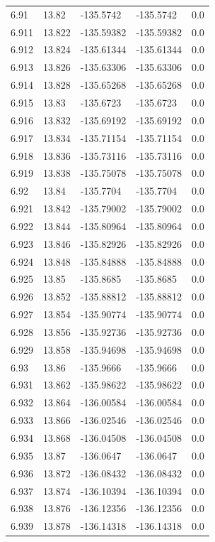 \begin{tabular}{lllll}
6.91 & 13.82 & -135.5742 & -135.5742 & 0.0 \\
6.911 & 13.822 & -135.59382 & -135.59382 & 0.0 \\
6.912 & 13.824 & -135.61344 & -135.61344 & 0.0 \\
6.913 & 13.826 & -135.63306 & -135.63306 & 0.0 \\
6.914 & 13.828 & -135.65268 & -135.65268 & 0.0 \\
6.915 & 13.83 & -135.6723 & -135.6723 & 0.0 \\
6.916 & 13.832 & -135.69192 & -135.69192 & 0.0 \\
6.917 & 13.834 & -135.71154 & -135.71154 & 0.0 \\
6.918 & 13.836 & -135.73116 & -135.73116 & 0.0 \\
6.919 & 13.838 & -135.75078 & -135.75078 & 0.0 \\
6.92 & 13.84 & -135.7704 & -135.7704 & 0.0 \\
6.921 & 13.842 & -135.79002 & -135.79002 & 0.0 \\
6.922 & 13.844 & -135.80964 & -135.80964 & 0.0 \\
6.923 & 13.846 & -135.82926 & -135.82926 & 0.0 \\
6.924 & 13.848 & -135.84888 & -135.84888 & 0.0 \\
6.925 & 13.85 & -135.8685 & -135.8685 & 0.0 \\
6.926 & 13.852 & -135.88812 & -135.88812 & 0.0 \\
6.927 & 13.854 & -135.90774 & -135.90774 & 0.0 \\
6.928 & 13.856 & -135.92736 & -135.92736 & 0.0 \\
6.929 & 13.858 & -135.94698 & -135.94698 & 0.0 \\
6.93 & 13.86 & -135.9666 & -135.9666 & 0.0 \\
6.931 & 13.862 & -135.98622 & -135.98622 & 0.0 \\
6.932 & 13.864 & -136.00584 & -136.00584 & 0.0 \\
6.933 & 13.866 & -136.02546 & -136.02546 & 0.0 \\
6.934 & 13.868 & -136.04508 & -136.04508 & 0.0 \\
6.935 & 13.87 & -136.0647 & -136.0647 & 0.0 \\
6.936 & 13.872 & -136.08432 & -136.08432 & 0.0 \\
6.937 & 13.874 & -136.10394 & -136.10394 & 0.0 \\
6.938 & 13.876 & -136.12356 & -136.12356 & 0.0 \\
6.939 & 13.878 & -136.14318 & -136.14318 & 0.0 \\

\end{tabular}
